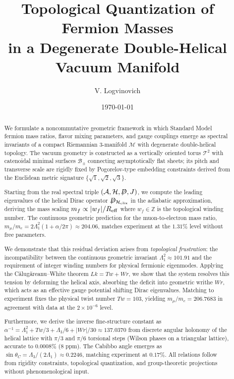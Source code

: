 \documentclass[12pt, a4paper]{article}
\theoremstyle{definition}
\newcommand{\cT}{\mathcal{T}}
\newcommand{\cB}{\mathcal{B}}
\newcommand{\cM}{\mathcal{M}}
\newcommand{\cA}{\mathcal{A}}
\newcommand{\cH}{\mathcal{H}}
\newcommand{\bbZ}{\mathbb{Z}}
\newcommand{\notD}{\not\!\!D}
\newcommand{\Hel}{\mathcal{H}_{\rm elix}}
\begin{document}
\title{Topological Quantization of Fermion Masses\\
in a Degenerate Double-Helical Vacuum Manifold}

\author[1]{V. Logvinovich}
\date{\today}

\maketitle

\begin{abstract}
We formulate a noncommutative geometric framework in which Standard Model fermion mass ratios, flavor mixing parameters, and gauge couplings emerge as spectral invariants of a compact Riemannian 3-manifold $\cM$ with degenerate double-helical topology. The vacuum geometry is constructed as a vertically oriented torus $\cT^2$ with catenoidal minimal surfaces $\cB_{\pm}$ connecting asymptotically flat sheets; its pitch and transverse scale are rigidly fixed by Pogorelov-type embedding constraints derived from the Euclidean metric signature $\{\sqrt{1},\sqrt{2},\sqrt{3}\}$.

Starting from the real spectral triple $(\cA,\cH,\notD,J)$, we compute the leading eigenvalues of the helical Dirac operator $\notD_{\Hel}$ in the adiabatic approximation, deriving the mass scaling $m_f \propto |w_f|/R_{\rm eff}$ where $w_f \in \bbZ$ is the topological winding number. The continuous geometric prediction for the muon-to-electron mass ratio, $m_\mu/m_e = 2\Lambda_1^2(1+\alpha/2\pi) \approx 204.06$, matches experiment at the $1.31\%$ level without free parameters.

We demonstrate that this residual deviation arises from \textit{topological frustration}: the incompatibility between the continuous geometric invariant $\Lambda_1^2 \approx 101.91$ and the requirement of integer winding numbers for physical fermionic eigenmodes. Applying the C\u{a}lug\u{a}reanu--White theorem $Lk = Tw + Wr$, we show that the system resolves this tension by deforming the helical axis, absorbing the deficit into geometric writhe $Wr$, which acts as an effective gauge potential shifting Dirac eigenvalues. Matching to experiment fixes the physical twist number $Tw = 103$, yielding $m_\mu/m_e = 206.7683$ in agreement with data at the $2\times 10^{-6}$ level.

Furthermore, we derive the inverse fine-structure constant as $\alpha^{-1} = \Lambda_1^2 + Tw/3 + \Lambda_3/6 + |Wr|/30 \approx 137.0370$ from discrete angular holonomy of the helical lattice with $\pi/3$ and $\pi/6$ torsional steps (Wilson phases on a triangular lattice), accurate to $0.0008\%$ (8 ppm). The Cabibbo angle emerges as $\sin\theta_C = \Lambda_3/(2\Lambda_1) \approx 0.2246$, matching experiment at $0.17\%$. All relations follow from rigidity constraints, topological quantization, and group-theoretic projections without phenomenological input.


\end{abstract}
\end{document}
